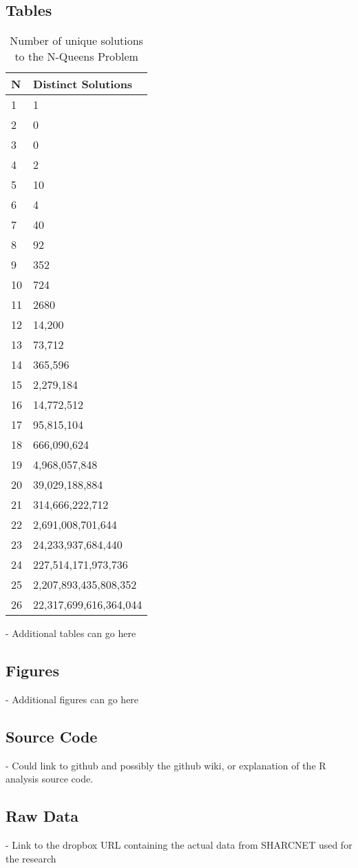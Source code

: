 \documentclass{sig-alternate}
\begin{document}
\subsection{Tables}
\begin{table}
\centering
\caption{Number of unique solutions to the N-Queens Problem}
\begin{tabular}{|l|l|} \hline
N & Distinct Solutions      \\ \hline
1  & 1                      \\
2  & 0                      \\
3  & 0                      \\
4  & 2                      \\
5  & 10                     \\
6  & 4                      \\
7  & 40                     \\
8  & 92                     \\
9  & 352                    \\
10 & 724                    \\
11 & 2680                   \\
12 & 14,200                 \\
13 & 73,712                 \\
14 & 365,596                \\
15 & 2,279,184              \\
16 & 14,772,512             \\
17 & 95,815,104             \\
18 & 666,090,624            \\
19 & 4,968,057,848          \\
20 & 39,029,188,884         \\
21 & 314,666,222,712        \\
22 & 2,691,008,701,644      \\
23 & 24,233,937,684,440     \\
24 & 227,514,171,973,736    \\
25 & 2,207,893,435,808,352  \\
26 & 22,317,699,616,364,044 \\
\hline\end{tabular}
\label{table:numuniquesol}
\end{table}
- Additional tables can go here




\subsection{Figures}

- Additional figures can go here

\subsection{Source Code}

- Could link to github and possibly the github wiki, or explanation
  of the R analysis source code.

\subsection{Raw Data}

- Link to the dropbox URL containing the actual data from SHARCNET used for the research
\end{document}
